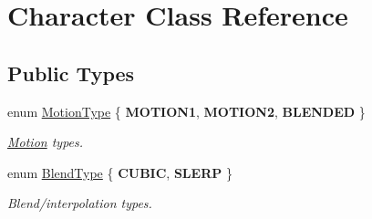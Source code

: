 \hypertarget{class_character}{}\section{Character Class Reference}
\label{class_character}
\subsection*{Public Types}
\begin{DoxyCompactItemize}
\item 
enum \hyperlink{class_character_a5b18aefe95ea78651499c858da123fd1}{Motion\+Type} \{ {\bfseries M\+O\+T\+I\+O\+N1}, 
{\bfseries M\+O\+T\+I\+O\+N2}, 
{\bfseries B\+L\+E\+N\+D\+ED}
 \}\hypertarget{class_character_a5b18aefe95ea78651499c858da123fd1}{}\label{class_character_a5b18aefe95ea78651499c858da123fd1}
\begin{DoxyCompactList}\small\item\em \hyperlink{class_motion}{Motion} types. \end{DoxyCompactList}
\item 
enum \hyperlink{class_character_a9bc67e2e9074936984ca7e0628743480}{Blend\+Type} \{ {\bfseries C\+U\+B\+IC}, 
{\bfseries S\+L\+E\+RP}
 \}\hypertarget{class_character_a9bc67e2e9074936984ca7e0628743480}{}\label{class_character_a9bc67e2e9074936984ca7e0628743480}
\begin{DoxyCompactList}\small\item\em Blend/interpolation types. \end{DoxyCompactList}
\end{DoxyCompactItemize}
